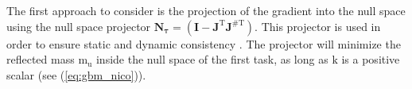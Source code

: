 % 
% 
%
%
%
%
%
%
%
%
%	
%
%	
%	
%	
%	
%
%
%
The first approach to consider is the projection of the gradient into the null space using the null space projector $\mathrm{\mathbf{N_{\tau}}} = \mathrm{(\mathbf{I} - \mathbf{J}^T \mathbf{J}^{\#T})}$. This projector is used in order to ensure static and dynamic consistency \cite{khatib1995}.  The  projector will minimize the reflected mass $\mathrm{m_u}$ inside the null space of the first task, as long as $\mathrm{k}$ is a positive scalar (see (\ref{eq:gbm_nico})).  




